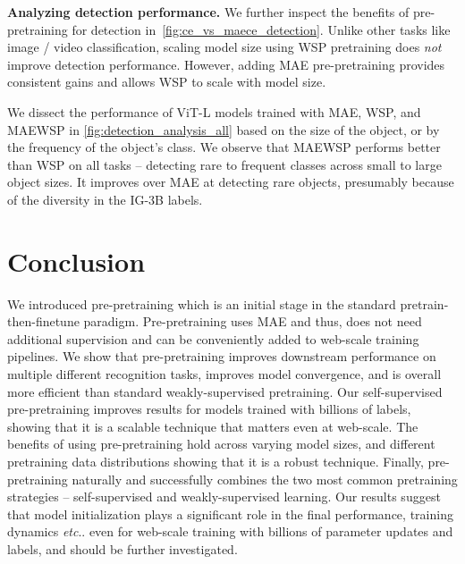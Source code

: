 \documentclass[10pt,twocolumn,letterpaper]{article}
\makeatletter
\DeclareRobustCommand\onedot{\futurelet\@let@token\@onedot}
\def\@onedot{\ifx\@let@token.\else.\null\fi\xspace}
\def\etc{\emph{etc}\onedot} \def\vs{\emph{vs}\onedot}
\newcommand{\prept}{pre-pretraining\xspace}
\newcommand{\Prept}{Pre-pretraining\xspace}
\newcommand{\mae}{MAE\xspace}
\newcommand{\ce}{WSP\xspace}
\newcommand{\ours}{MAEWSP\xspace}  \newcommand{\oursig}{\ours{}\textsubscript{IG}\xspace}
\newcommand{\vitL}{ViT-L\xspace}
\newcommand{\igSizeShort}{IG-3B\xspace}
\makeatother
\begin{document}
 \noindent \textbf{Analyzing detection performance.}
We further inspect the benefits of \prept for detection in~\cref{fig:ce_vs_maece_detection}.
Unlike other tasks like image / video classification, scaling model size using \ce pretraining does \emph{not} improve 
detection performance.
However, adding \mae \prept provides consistent gains and allows \ce to scale with model size.

We dissect the performance of \vitL models trained with \mae, \ce, and \ours in \cref{fig:detection_analysis_all}
based on the size of the object, or by the frequency of the object's class.
We observe that \ours performs better than \ce on all tasks -- detecting rare to frequent classes across small to large object sizes.
It improves over \mae at detecting rare objects, presumably because of the diversity in the \igSizeShort labels.














  \section{Conclusion}
\label{sec:conclusion}

We introduced \prept which is an initial stage in the standard pretrain-then-finetune paradigm.
\Prept uses \mae and thus, does not need additional supervision and can be conveniently added to web-scale training pipelines.
We show that \prept improves downstream performance on multiple different recognition tasks, improves model convergence, and is overall more efficient than standard weakly-supervised pretraining.
Our self-supervised \prept improves results for models trained with billions of labels, showing that it is a scalable technique that matters even at web-scale.
The benefits of using \prept hold across varying model sizes, and different pretraining data distributions showing that it is a robust technique.
Finally, \prept naturally and successfully combines the two most common pretraining strategies -- self-supervised and weakly-supervised learning.
Our results suggest that model initialization plays a significant role in the final performance, training dynamics \etc even for web-scale training with billions of parameter updates and labels, and should be further investigated.
 \clearpage

{\small


}
\end{document}
